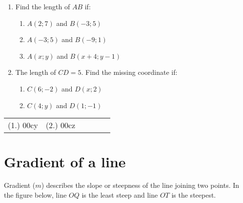 \begin{exercises}{}{
\begin{enumerate}[label=\textbf{\arabic*}.]
\item Find the length of $AB$ if:
 \begin{enumerate}[noitemsep, label=\textbf{(\alph*)} ] 
\item $A(2;7)$ and $B(-3;5)$
\item $A(-3;5)$ and $B(-9;1)$
\item $A(x;y)$ and $B(x+4;y-1)$
\end{enumerate}

\item The length of $CD=5$. Find the missing coordinate if:
 \begin{enumerate}[noitemsep, label=\textbf{(\alph*)} ] 
\item $C(6;-2)$ and $D(x;2)$
\item $C(4;y)$ and $D(1;-1)$
\end{enumerate}
\end{enumerate}
\practiceinfo
\par 
\par \begin{tabular}[h]{cccccc}
(1.) 00cy&  (2.) 00cz\end{tabular}

}
\end{exercises}

%     
%     
%     

\section{Gradient of a line}
Gradient ($m$) describes the slope or steepness of the line joining two points. In the figure below, line $OQ$ is the least steep and line $OT$ is the steepest.

